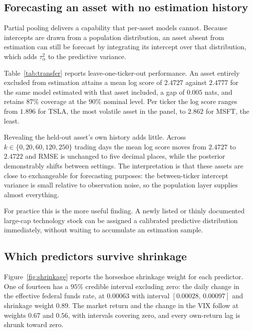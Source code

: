 \subsection{Forecasting an asset with no estimation history}
\label{sec:transfer}

Partial pooling delivers a capability that per-asset models cannot. Because
intercepts are drawn from a population distribution, an asset absent from
estimation can still be forecast by integrating its intercept over that
distribution, which adds $\tau_\alpha^2$ to the predictive variance.

Table~\ref{tab:transfer} reports leave-one-ticker-out performance. An asset
entirely excluded from estimation attains a mean log score of $2.4727$ against
$2.4777$ for the same model estimated with that asset included, a gap of
$0.005$ nats, and retains $87\%$ coverage at the $90\%$ nominal level. Per
ticker the log score ranges from $1.896$ for TSLA, the most volatile asset in
the panel, to $2.862$ for MSFT, the least.

Revealing the held-out asset's own history adds little. Across
$k \in \{0, 20, 60, 120, 250\}$ trading days the mean log score moves from
$2.4727$ to $2.4722$ and RMSE is unchanged to five decimal places, while the
posterior demonstrably shifts between settings. The interpretation is that these
assets are close to exchangeable for forecasting purposes: the between-ticker
intercept variance is small relative to observation noise, so the population
layer supplies almost everything.

For practice this is the more useful finding. A newly listed or thinly
documented large-cap technology stock can be assigned a calibrated predictive
distribution immediately, without waiting to accumulate an estimation sample.

\subsection{Which predictors survive shrinkage}
\label{sec:selection}

Figure~\ref{fig:shrinkage} reports the horseshoe shrinkage weight for each
predictor. One of fourteen has a $95\%$ credible interval excluding zero: the
daily change in the effective federal funds rate, at $0.00063$ with interval
$[0.00028,\,0.00097]$ and shrinkage weight $0.89$. The market return and the
change in the VIX follow at weights $0.67$ and $0.56$, with intervals covering
zero, and every own-return lag is shrunk toward zero.

